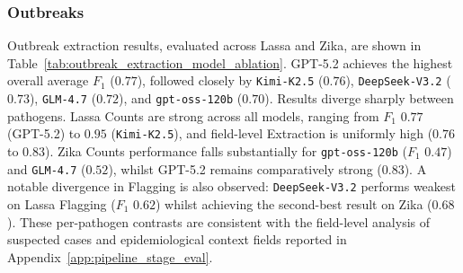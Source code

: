 \subsubsection*{Outbreaks}

Outbreak extraction results, evaluated across Lassa and Zika, are shown in Table~\ref{tab:outbreak_extraction_model_ablation}. GPT-5.2 achieves the highest overall average $F_1$ ($0.77$), followed closely by \texttt{Kimi-K2.5} ($0.76$), \texttt{DeepSeek-V3.2} ($0.73$), \texttt{GLM-4.7} ($0.72$), and \texttt{gpt-oss-120b} ($0.70$). Results diverge sharply between pathogens. Lassa Counts are strong across all models, ranging from $F_1$ $0.77$ (GPT-5.2) to $0.95$ (\texttt{Kimi-K2.5}), and field-level Extraction is uniformly high ($0.76$ to $0.83$). Zika Counts performance falls substantially for \texttt{gpt-oss-120b} ($F_1$ $0.47$) and \texttt{GLM-4.7} ($0.52$), whilst GPT-5.2 remains comparatively strong ($0.83$). A notable divergence in Flagging is also observed: \texttt{DeepSeek-V3.2} performs weakest on Lassa Flagging ($F_1$ $0.62$) whilst achieving the second-best result on Zika ($0.68$). These per-pathogen contrasts are consistent with the field-level analysis of suspected cases and epidemiological context fields reported in Appendix~\ref{app:pipeline_stage_eval}.


